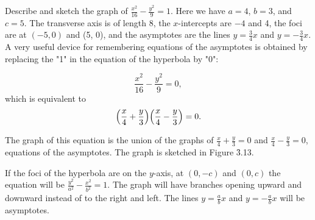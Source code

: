 \begin{example}
Describe and sketch the graph of $\frac{x^2}{16} - \frac{y^2}{9} = 1$. Here we have $a = 4$, $b = 3$, and $c = 5$. The transverse axis is of length 8, the $x$-intercepts are $-4$ and 4, the foci are at $(-5, 0)$ and (5, 0), and the asymptotes are the lines $y = \frac{3}{4}x$ and $y = - \frac{3}{4}x$. A very useful device for remembering equations of the asymptotes is obtained by replacing the "1" in the equation of the hyperbola by "0":

$$
\frac{x^2}{16} - \frac{y^2}{9} = 0,
$$
\noindent which is equivalent to
$$
\Bigl(\frac{x}{4} + \frac{y}{3} \Bigr) \Bigl(\frac{x}{4} - \frac{y}{3} \Bigr) = 0.
$$

\noindent The graph of this equation is the union of the graphs of $\frac{x}{4} + \frac{y}{3} = 0$ and $\frac{x}{4} - \frac{y}{3} = 0$, equations of the asymptotes. The graph is sketched in Figure \f{3.13}.

If the foci of the hyperbola are on the $y$-axis, at $(0, -c)$ and $(0, c)$ the equation will be $\frac{y^2}{a^2} - \frac{x^2}{b^2} = 1$. The graph will have branches opening upward and downward instead of to the right and left. The lines $y = \frac{a}{b}x$ and $y = -\frac{a}{b} x$ will be asymptotes.
\end{example}
\medskip

